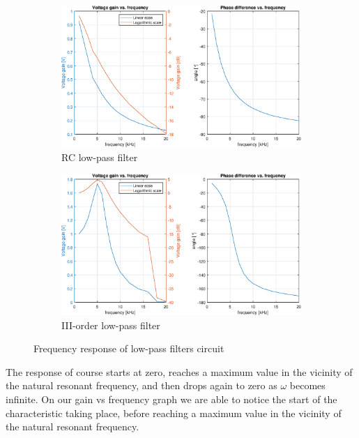 \documentclass[notitlepage, a4paper, 11pt]{article}
\begin{document}
	\begin{figure}[H]
	\centering
	\begin{subfigure}{0.49\textwidth}
		\includegraphics[width=\textwidth]{../Matlab/img/11.eps}
		\caption{RC low-pass filter}
	\end{subfigure}
	\hfill
	\begin{subfigure}{0.49\textwidth}
		\includegraphics[width=\textwidth]{../Matlab/img/12.eps}
		\caption{III-order low-pass filter}
	\end{subfigure}
	\caption{Frequency response of low-pass filters circuit}
	\end{figure}
	
	The response of course starts at zero, reaches a maximum value in the vicinity of the natural resonant frequency, and then drops again to zero as $\omega$ becomes infinite. On our gain vs frequency graph we are able to notice the start of the characteristic taking place, before reaching a maximum value in the vicinity of the natural resonant frequency.
	
\end{document}
